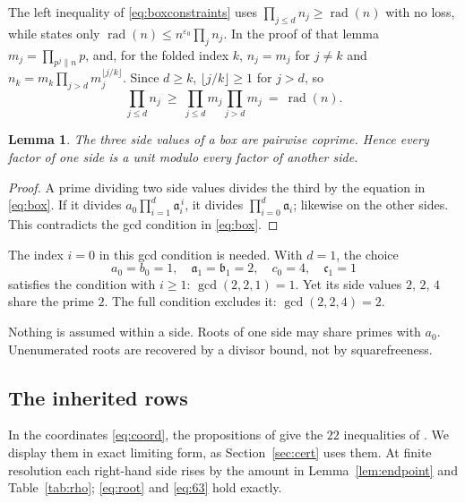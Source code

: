 \documentclass{amsart}
\newtheorem{lemma}{Lemma}[section]
\numberwithin{equation}{section}
\numberwithin{table}{section}
\newcommand{\rad}{\operatorname{rad}}
\begin{document}
The left inequality of \eqref{eq:boxconstraints} uses
$\prod_{j\le d}n_j\ge\rad(n)$ with no loss, while \cite[Lemma~2.2]{BBLT}
states only $\rad(n)\le n^{\varepsilon_0}\prod_jn_j$. In the proof of that
lemma
$m_j=\prod_{p^{j}\|n}p$, and, for the folded index $k$, $n_j=m_j$ for
$j\ne k$ and $n_k=m_k\prod_{j>d}m_j^{\lfloor j/k\rfloor}$. Since $d\ge k$,
$\lfloor j/k\rfloor\ge1$ for $j>d$, so
\[
 \prod_{j\le d}n_j\ \ge\ \prod_{j\le d}m_j\prod_{j>d}m_j\ =\ \rad(n).
\]

\begin{lemma}\label{lem:coprime}
The three side values of a box are pairwise coprime. Hence every factor of one
side is a unit modulo every factor of another side.
\end{lemma}

\begin{proof}
 A prime dividing two side values divides the third by the equation in
\eqref{eq:box}. If it divides
$a_0\prod_{i=1}^d\mathfrak a_i^{\,i}$, it divides $\prod_{i=0}^d\mathfrak a_i$;
likewise on the other sides. This contradicts the gcd condition in
\eqref{eq:box}.
\end{proof}

The index $i=0$ in this gcd condition is needed. With $d=1$, the choice
\[
 a_0=b_0=1,\quad \mathfrak a_1=\mathfrak b_1=2,\quad c_0=4,\quad \mathfrak c_1=1
\]
satisfies the condition with $i\ge1$: $\gcd(2,2,1)=1$. Yet its side values
$2$, $2$, $4$ share the prime $2$. The
full condition excludes it: $\gcd(2,2,4)=2$.

Nothing is assumed within a side. Roots of one side may share primes with
$a_0$. Unenumerated roots are recovered by a divisor bound, not by
squarefreeness.

\subsection{The inherited rows}
In the coordinates \eqref{eq:coord}, the propositions of \cite{BBLT} give the
$22$ inequalities of \cite[Proposition~6.1]{BBLT}. We display them in exact
limiting form, as Section~\ref{sec:cert} uses them. At finite resolution each
right-hand side rises by the amount in Lemma~\ref{lem:endpoint} and
Table~\ref{tab:rho}; \eqref{eq:root} and \eqref{eq:63} hold exactly.
\end{document}
